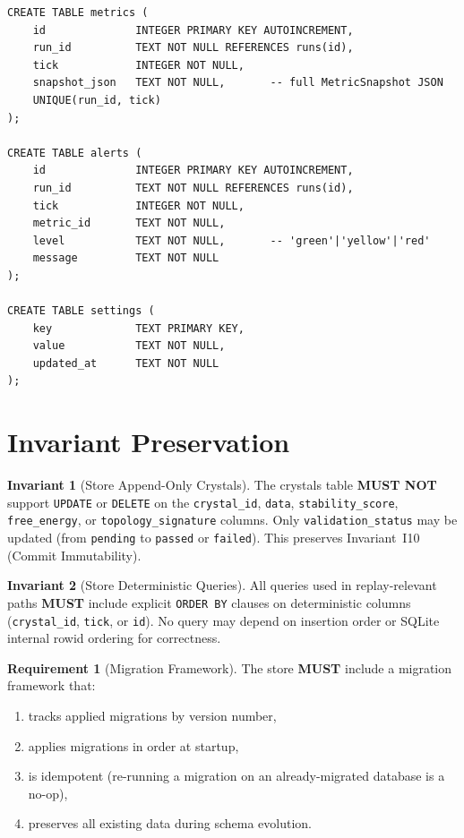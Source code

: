 \documentclass[11pt,a4paper,twoside]{article}
\theoremstyle{definition}
\newtheorem{requirement}{Requirement}[section]
\newtheorem{invariant}{Invariant}[section]
\theoremstyle{plain}
\theoremstyle{remark}
\begin{document}
\begin{verbatim}
CREATE TABLE metrics (
    id              INTEGER PRIMARY KEY AUTOINCREMENT,
    run_id          TEXT NOT NULL REFERENCES runs(id),
    tick            INTEGER NOT NULL,
    snapshot_json   TEXT NOT NULL,       -- full MetricSnapshot JSON
    UNIQUE(run_id, tick)
);

CREATE TABLE alerts (
    id              INTEGER PRIMARY KEY AUTOINCREMENT,
    run_id          TEXT NOT NULL REFERENCES runs(id),
    tick            INTEGER NOT NULL,
    metric_id       TEXT NOT NULL,
    level           TEXT NOT NULL,       -- 'green'|'yellow'|'red'
    message         TEXT NOT NULL
);

CREATE TABLE settings (
    key             TEXT PRIMARY KEY,
    value           TEXT NOT NULL,
    updated_at      TEXT NOT NULL
);
\end{verbatim}


\section{Invariant Preservation}\label{sec:store:invariants}

\begin{invariant}[Store Append-Only Crystals]\label{inv:storeappend}
The crystals table \textbf{MUST NOT} support \texttt{UPDATE} or
\texttt{DELETE} on the \texttt{crystal\_id}, \texttt{data},
\texttt{stability\_score}, \texttt{free\_energy}, or
\texttt{topology\_signature} columns. Only
\texttt{validation\_status} may be updated (from \texttt{pending} to
\texttt{passed} or \texttt{failed}). This preserves Invariant~I10
(Commit Immutability).
\end{invariant}

\begin{invariant}[Store Deterministic Queries]\label{inv:storedeterm}
All queries used in replay-relevant paths \textbf{MUST} include
explicit \texttt{ORDER BY} clauses on deterministic columns
(\texttt{crystal\_id}, \texttt{tick}, or \texttt{id}). No query may
depend on insertion order or SQLite internal rowid ordering for
correctness.
\end{invariant}

\begin{requirement}[Migration Framework]\label{req:migration}
The store \textbf{MUST} include a migration framework that:
\begin{enumerate}[nosep,label=(\alph*)]
  \item tracks applied migrations by version number,
  \item applies migrations in order at startup,
  \item is idempotent (re-running a migration on an already-migrated
        database is a no-op),
  \item preserves all existing data during schema evolution.
\end{enumerate}
\end{requirement}
\end{document}
